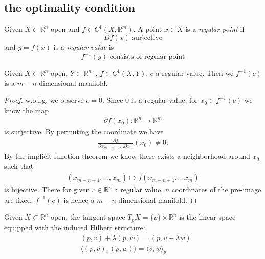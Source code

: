 \subsection{the optimality condition}
\begin{theorem}
\end{theorem}

\begin{definition}
	Given $X \subset \mathbb{R}^n$ open and $f \in C^1 (X, \mathbb{R}^m)$. A point $x \in X$ is a \textit{regular point} if 
	\begin{equation*}
		D f(x)  \text{ surjective}
	\end{equation*}
	and $y = f(x)$ is a \textit{regular value} is 
	\begin{equation*}
		f^{-1}(y) \text{ consists of regular point}
	\end{equation*}
\end{definition}

\begin{theorem}
	Given $X \subset \mathbb{R}^n$ open, $Y \subset \mathbb{R}^m$ , $f \in C^1(X, Y)$. $c$ a regular value. Then we $f^{-1}(c)$ is a $m - n$ dimensional manifold. 
\end{theorem}
\begin{proof}
	w.o.l.g. we observe $c = 0$. Since $0$ is a regular value, for $x_0 \in f^{-1}(c)$ we know the map
	\begin{align*}
		\partial f(x_0): \mathbb{R}^n \rightarrow \mathbb{R}^m
	\end{align*}
	is surjective. By permuting the coordinate we have 
	\begin{align*}
		\frac{\partial f}{\partial x_{m - n + 1} \dots \partial x_m}(x_0) \neq 0. 
	\end{align*}
	By the implicit function theorem we know there exists a neighborhood around $x_0$ such that
	\begin{align*}
		(x_{m - n + 1}, \dots, x_m) \mapsto f(x_{m-n+1} \dots, x_m)
	\end{align*}
	is bijective. There for given $c \in \mathbb{R}^n$ a regular value, $n$ coordinates of the pre-image are fixed. $f^{-1}(c)$ is hence a $m - n$ dimensional manifold. 
\end{proof}

\begin{definition}
	Given $X \subset \mathbb{R}^n$ open, the tangent space $T_pX = \{p\} \times \mathbb{R}^n$ is the linear space equipped with the induced Hilbert structure:
	\begin{equation*}
	\begin{aligned}
		& (p, v) + \lambda (p, w) = (p, v + \lambda w)\\
		& \langle(p, v), (p, w) \rangle = \langle v, w \rangle_p
	\end{aligned}
	\end{equation*} 
\end{definition}


